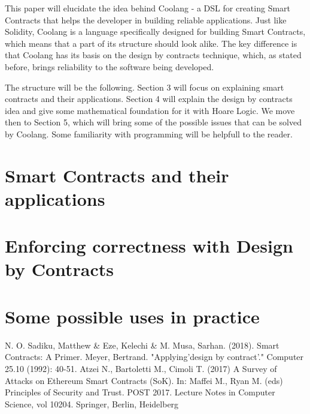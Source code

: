 \documentclass{article}
\begin{document}
This paper will elucidate the idea behind Coolang - a DSL for creating Smart Contracts that helps the developer in building reliable applications. Just like Solidity, Coolang is a language specifically designed for building Smart Contracts, which means that a part of its structure should look alike. The key difference is that Coolang has its basis on the design by contracts technique, which, as stated before, brings reliability to the software being developed. 

The structure will be the following. Section 3 will focus on explaining smart contracts and their applications. Section 4 will explain the design by contracts idea and give some mathematical foundation for it with Hoare Logic. We move then to Section 5, which will bring some of the possible issues that can be solved by Coolang. Some familiarity with programming will be helpfull to the reader. 

\section{Smart Contracts and their applications}

\section{Enforcing correctness with Design by Contracts}

\section{Some possible uses in practice}


\begin{thebibliography}{9}
N. O. Sadiku, Matthew \& Eze, Kelechi \& M. Musa, Sarhan. (2018). Smart Contracts: A Primer. 
Meyer, Bertrand. "Applying'design by contract'." Computer 25.10 (1992): 40-51.
Atzei N., Bartoletti M., Cimoli T. (2017) A Survey of Attacks on Ethereum Smart Contracts (SoK). In: Maffei M., Ryan M. (eds) Principles of Security and Trust. POST 2017. Lecture Notes in Computer Science, vol 10204. Springer, Berlin, Heidelberg
\end{thebibliography}
\end{document}
